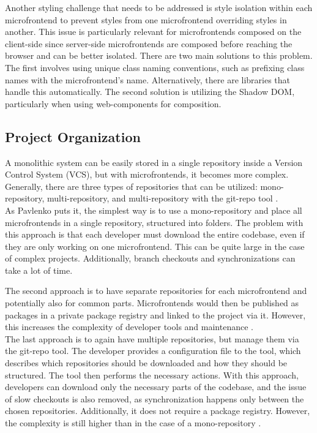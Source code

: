 \noindent
Another styling challenge that needs to be addressed is style isolation within each microfrontend to prevent styles from one microfrontend overriding styles in another. This issue is particularly relevant for microfrontends composed on the client-side since server-side microfrontends are composed before reaching the browser and can be better isolated. There are two main solutions to this problem. The first involves using unique class naming conventions, such as prefixing class names with the microfrontend's name. Alternatively, there are libraries that handle this automatically. The second solution is utilizing the Shadow DOM, particularly when using web-components for composition.

\subsection{Project Organization}
A monolithic system can be easily stored in a single repository inside a Version Control System (VCS), but with microfrontends, it becomes more complex. Generally, there are three types of repositories that can be utilized: mono-repository, multi-repository, and multi-repository with the git-repo tool \cite{Pavlenko}. \\

\noindent
As Pavlenko \cite{Pavlenko} puts it, the simplest way is to use a mono-repository and place all microfrontends in a single repository, structured into folders. The problem with this approach is that each developer must download the entire codebase, even if they are only working on one microfrontend. This can be quite large in the case of complex projects. Additionally, branch checkouts and synchronizations can take a lot of time.

\noindent
The second approach is to have separate repositories for each microfrontend and potentially also for common parts. Microfrontends would then be published as packages in a private package registry and linked to the project via it. However, this increases the complexity of developer tools and maintenance \cite{Pavlenko}.\\

\noindent
The last approach is to again have multiple repositories, but manage them via the git-repo tool. The developer provides a configuration file to the tool, which describes which repositories should be downloaded and how they should be structured. The tool then performs the necessary actions. With this approach, developers can download only the necessary parts of the codebase, and the issue of slow checkouts is also removed, as synchronization happens only between the chosen repositories. Additionally, it does not require a package registry. However, the complexity is still higher than in the case of a mono-repository \cite{Pavlenko}.
